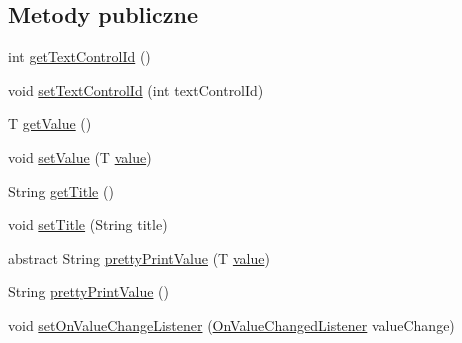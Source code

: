 \subsection*{Metody publiczne}
\begin{DoxyCompactItemize}
\item 
int \hyperlink{classpl_1_1edu_1_1uwb_1_1mobiuwb_1_1view_1_1settings_1_1adapter_1_1items_1_1dialog_1_1_dialog_item_model_a65279429db868a90a6c28328c7d80696}{get\+Text\+Control\+Id} ()
\item 
void \hyperlink{classpl_1_1edu_1_1uwb_1_1mobiuwb_1_1view_1_1settings_1_1adapter_1_1items_1_1dialog_1_1_dialog_item_model_ae9052a1f6bcc5567a55f7117fa6841ec}{set\+Text\+Control\+Id} (int text\+Control\+Id)
\item 
T \hyperlink{classpl_1_1edu_1_1uwb_1_1mobiuwb_1_1view_1_1settings_1_1adapter_1_1items_1_1dialog_1_1_dialog_item_model_acdcff4c92c2bbdd42b3375aa9220adbd}{get\+Value} ()
\item 
void \hyperlink{classpl_1_1edu_1_1uwb_1_1mobiuwb_1_1view_1_1settings_1_1adapter_1_1items_1_1dialog_1_1_dialog_item_model_aedaa5766587613a571b6a3decf068502}{set\+Value} (T \hyperlink{classpl_1_1edu_1_1uwb_1_1mobiuwb_1_1view_1_1settings_1_1adapter_1_1items_1_1dialog_1_1_dialog_item_model_a6fc8d7f0a0759f12346fdd34666aaf39}{value})
\item 
String \hyperlink{classpl_1_1edu_1_1uwb_1_1mobiuwb_1_1view_1_1settings_1_1adapter_1_1items_1_1dialog_1_1_dialog_item_model_a18d8241b5ad5cff1683b8e3f6fb9aeb7}{get\+Title} ()
\item 
void \hyperlink{classpl_1_1edu_1_1uwb_1_1mobiuwb_1_1view_1_1settings_1_1adapter_1_1items_1_1dialog_1_1_dialog_item_model_a1c1fe137d8abc6a1f37a953fd20bbaa1}{set\+Title} (String title)
\item 
abstract String \hyperlink{classpl_1_1edu_1_1uwb_1_1mobiuwb_1_1view_1_1settings_1_1adapter_1_1items_1_1dialog_1_1_dialog_item_model_aac641bba274334547d941258c8742dfb}{pretty\+Print\+Value} (T \hyperlink{classpl_1_1edu_1_1uwb_1_1mobiuwb_1_1view_1_1settings_1_1adapter_1_1items_1_1dialog_1_1_dialog_item_model_a6fc8d7f0a0759f12346fdd34666aaf39}{value})
\item 
String \hyperlink{classpl_1_1edu_1_1uwb_1_1mobiuwb_1_1view_1_1settings_1_1adapter_1_1items_1_1dialog_1_1_dialog_item_model_a174c870d675f7eb59920677473d45b09}{pretty\+Print\+Value} ()
\item 
void \hyperlink{classpl_1_1edu_1_1uwb_1_1mobiuwb_1_1view_1_1settings_1_1adapter_1_1items_1_1dialog_1_1_dialog_item_model_a8411aaa5cf84aeeebe7cc6257294633a}{set\+On\+Value\+Change\+Listener} (\hyperlink{interfacepl_1_1edu_1_1uwb_1_1mobiuwb_1_1interfaces_1_1_on_value_changed_listener}{On\+Value\+Changed\+Listener} value\+Change)

\end{DoxyCompactItemize}

